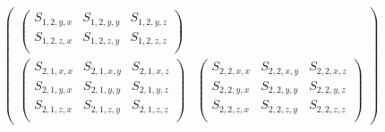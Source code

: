 \begin{equation}
\begin{gathered}
\begin{pmatrix}
\begin{pmatrix}
            S_{1, 2, y, x} & S_{1, 2, y, y} & S_{1, 2, y, z} \\
            S_{1, 2, z, x} & S_{1, 2, z, y} & S_{1, 2, z, z} \\
        \end{pmatrix}
        \\
        \begin{pmatrix}
            S_{2, 1, x, x} & S_{2, 1, x, y} & S_{2, 1, x, z} \\
            S_{2, 1, y, x} & S_{2, 1, y, y} & S_{2, 1, y, z} \\
            S_{2, 1, z, x} & S_{2, 1, z, y} & S_{2, 1, z, z} \\
        \end{pmatrix}
        &
        \begin{pmatrix}
            S_{2, 2, x, x} & S_{2, 2, x, y} & S_{2, 2, x, z} \\
            S_{2, 2, y, x} & S_{2, 2, y, y} & S_{2, 2, y, z} \\
            S_{2, 2, z, x} & S_{2, 2, z, y} & S_{2, 2, z, z} \\
        \end{pmatrix}
    \end{pmatrix}
    \end{gathered}
    \label{eq:matrix_of_matrices}
\end{equation}

